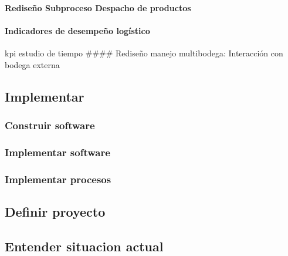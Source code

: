 \documentclass[11pt]{article}
\begin{document}
\hypertarget{rediseuxf1o-subproceso-despacho-de-productos}{%
\paragraph{Rediseño Subproceso Despacho de
productos}\label{rediseuxf1o-subproceso-despacho-de-productos}}

\hypertarget{indicadores-de-desempeuxf1o-loguxedstico}{%
\paragraph{Indicadores de desempeño
logístico}\label{indicadores-de-desempeuxf1o-loguxedstico}}

kpi estudio de tiempo \#\#\#\# Rediseño manejo multibodega: Interacción
con bodega externa

\hypertarget{implementar-1}{%
\subsection{Implementar}\label{implementar-1}}

\hypertarget{construir-software-1}{%
\subsubsection{Construir software}\label{construir-software-1}}

\hypertarget{implementar-software-1}{%
\subsubsection{Implementar software}\label{implementar-software-1}}

\hypertarget{implementar-procesos-1}{%
\subsubsection{Implementar procesos}\label{implementar-procesos-1}}

\hypertarget{definir-proyecto-2}{%
\subsection{Definir proyecto}\label{definir-proyecto-2}}

\hypertarget{entender-situacion-actual}{%
\subsection{Entender situacion actual}\label{entender-situacion-actual}}
\end{document}
